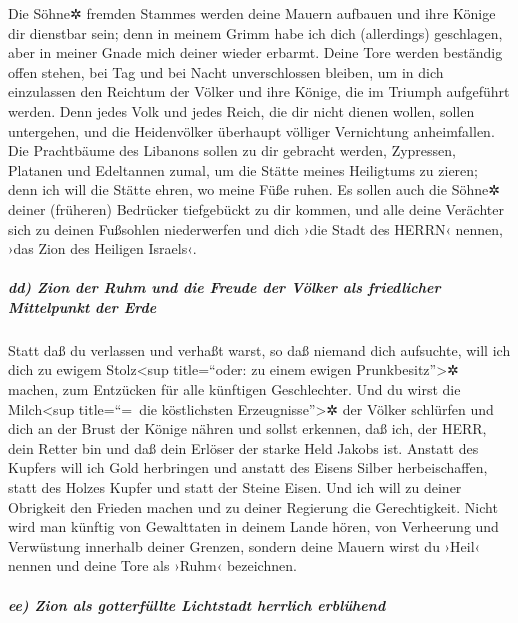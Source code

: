 Die Söhne✲ fremden Stammes werden deine Mauern aufbauen
und ihre Könige dir dienstbar sein; denn in meinem Grimm habe ich dich
(allerdings) geschlagen, aber in meiner Gnade mich deiner wieder
erbarmt. Deine Tore werden beständig offen stehen, bei
Tag und bei Nacht unverschlossen bleiben, um in dich einzulassen den
Reichtum der Völker und ihre Könige, die im Triumph aufgeführt werden.
Denn jedes Volk und jedes Reich, die dir nicht dienen
wollen, sollen untergehen, und die Heidenvölker überhaupt völliger
Vernichtung anheimfallen. Die Prachtbäume des Libanons
sollen zu dir gebracht werden, Zypressen, Platanen und Edeltannen zumal,
um die Stätte meines Heiligtums zu zieren; denn ich will die Stätte
ehren, wo meine Füße ruhen. Es sollen auch die Söhne✲
deiner (früheren) Bedrücker tiefgebückt zu dir kommen, und alle deine
Verächter sich zu deinen Fußsohlen niederwerfen und dich ›die Stadt des
HERRN‹ nennen, ›das Zion des Heiligen Israels‹.

\hypertarget{dd-zion-der-ruhm-und-die-freude-der-vuxf6lker-als-friedlicher-mittelpunkt-der-erde}{%
\subparagraph{dd) Zion der Ruhm und die Freude der Völker als
friedlicher Mittelpunkt der
Erde}\label{dd-zion-der-ruhm-und-die-freude-der-vuxf6lker-als-friedlicher-mittelpunkt-der-erde}}

Statt daß du verlassen und verhaßt warst, so daß niemand
dich aufsuchte, will ich dich zu ewigem Stolz\textless sup title=``oder:
zu einem ewigen Prunkbesitz''\textgreater✲ machen, zum Entzücken für
alle künftigen Geschlechter. Und du wirst die
Milch\textless sup title=``=~die köstlichsten Erzeugnisse''\textgreater✲
der Völker schlürfen und dich an der Brust der Könige nähren und sollst
erkennen, daß ich, der HERR, dein Retter bin und daß dein Erlöser der
starke Held Jakobs ist. Anstatt des Kupfers will ich Gold
herbringen und anstatt des Eisens Silber herbeischaffen, statt des
Holzes Kupfer und statt der Steine Eisen. Und ich will zu deiner
Obrigkeit den Frieden machen und zu deiner Regierung die Gerechtigkeit.
Nicht wird man künftig von Gewalttaten in deinem Lande
hören, von Verheerung und Verwüstung innerhalb deiner Grenzen, sondern
deine Mauern wirst du ›Heil‹ nennen und deine Tore als ›Ruhm‹
bezeichnen.

\hypertarget{ee-zion-als-gotterfuxfcllte-lichtstadt-herrlich-erbluxfchend}{%
\subparagraph{ee) Zion als gotterfüllte Lichtstadt herrlich
erblühend}\label{ee-zion-als-gotterfuxfcllte-lichtstadt-herrlich-erbluxfchend}}

